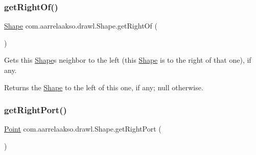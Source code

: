 \mbox{\label{classcom_1_1aarrelaakso_1_1drawl_1_1_shape_a1ad573b06f341aa79f6a255a476ae6e4}} 
\subsubsection{\texorpdfstring{get\+Right\+Of()}{getRightOf()}}
{\footnotesize\ttfamily \hyperlink{classcom_1_1aarrelaakso_1_1drawl_1_1_shape}{Shape} com.\+aarrelaakso.\+drawl.\+Shape.\+get\+Right\+Of (\begin{DoxyParamCaption}{ }\end{DoxyParamCaption})\hspace{0.3cm}{\ttfamily [inherited]}}



Gets this \hyperlink{classcom_1_1aarrelaakso_1_1drawl_1_1_shape}{Shape}\textquotesingle{}s neighbor to the left (this \hyperlink{classcom_1_1aarrelaakso_1_1drawl_1_1_shape}{Shape} is to the right of that one), if any. 

\begin{DoxyReturn}{Returns}
the \hyperlink{classcom_1_1aarrelaakso_1_1drawl_1_1_shape}{Shape} to the left of this one, if any; {\ttfamily null} otherwise. 
\end{DoxyReturn}
\mbox{\label{classcom_1_1aarrelaakso_1_1drawl_1_1_shape_a319c78d425ec91e1aef1072a95e349ad}} 
\subsubsection{\texorpdfstring{get\+Right\+Port()}{getRightPort()}}
{\footnotesize\ttfamily \hyperlink{classcom_1_1aarrelaakso_1_1drawl_1_1_point}{Point} com.\+aarrelaakso.\+drawl.\+Shape.\+get\+Right\+Port (\begin{DoxyParamCaption}{ }\end{DoxyParamCaption})\hspace{0.3cm}{\ttfamily [inherited]}}



